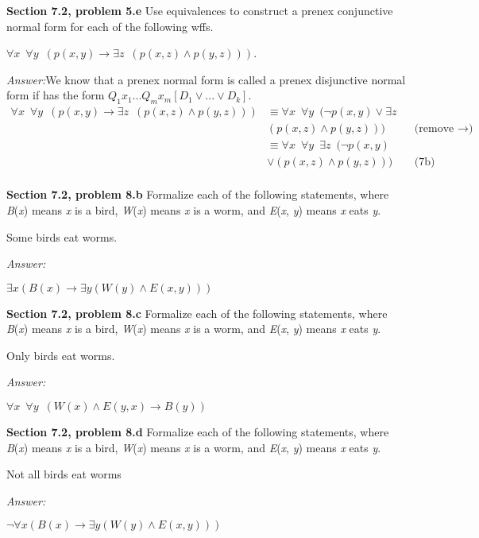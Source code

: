 \documentclass[12pt]{article}
\begin{document}
\textbf{Section 7.2, problem 5.e}  Use equivalences to construct 
a prenex conjunctive normal form for each of the following wffs.

$\forall x \enspace \forall y \enspace (p(x,y) \rightarrow \exists z \enspace (p(x,z) \land p(y,z)))$.

\emph{Answer:}We know that a prenex normal form is called a prenex disjunctive normal form 
if has the form $Q_1x_1...Q_m x_m[D_1 \lor ...\lor D_k]$.
\begin{align*}
\forall x \enspace \forall y \enspace (p(x,y) \rightarrow \exists z \enspace (p(x,z) \land p(y,z)))
    & \equiv \forall x \enspace \forall y \enspace (\neg p(x,y) \lor \exists z \\
    & (p(x,z) \land p(y,z)))    && \text{(remove $\rightarrow$)} \\
    & \equiv \forall x \enspace \forall y \enspace \exists z \enspace (\neg p(x,y) \\
    & \lor (p(x,z) \land p(y,z)))                       && \text{(7b)} \\
\end{align*}


\textbf{Section 7.2, problem 8.b}  Formalize each of the following statements, 
where \emph{B}(\emph{x}) means \emph{x} is a bird, \emph{W}(\emph{x}) means \emph{x} is a worm, and 
\emph{E}(\emph{x}, \emph{y}) means \emph{x} eats \emph{y}.

Some birds eat worms.

\emph{Answer:}
\begin{center}
$\exists x(B(x) \rightarrow \exists y (W(y) \land E(x,y)))$    
\end{center}

\textbf{Section 7.2, problem 8.c}  Formalize each of the following statements, 
where \emph{B}(\emph{x}) means \emph{x} is a bird, \emph{W}(\emph{x}) means \emph{x} is a worm, and 
\emph{E}(\emph{x}, \emph{y}) means \emph{x} eats \emph{y}.

Only birds eat worms.

\emph{Answer:} 
\begin{center}
$\forall x \enspace \forall y \enspace (W(x) \land E(y,x) \rightarrow B(y))$\\
\end{center}

\textbf{Section 7.2, problem 8.d}  Formalize each of the following statements, 
where \emph{B}(\emph{x}) means \emph{x} is a bird, \emph{W}(\emph{x}) means \emph{x} is a worm, and 
\emph{E}(\emph{x}, \emph{y}) means \emph{x} eats \emph{y}.

Not all birds eat worms

\emph{Answer:}
\begin{center}
$\neg \forall x(B(x) \rightarrow \exists y (W(y) \land E(x,y)))$    
\end{center}
\end{document}
